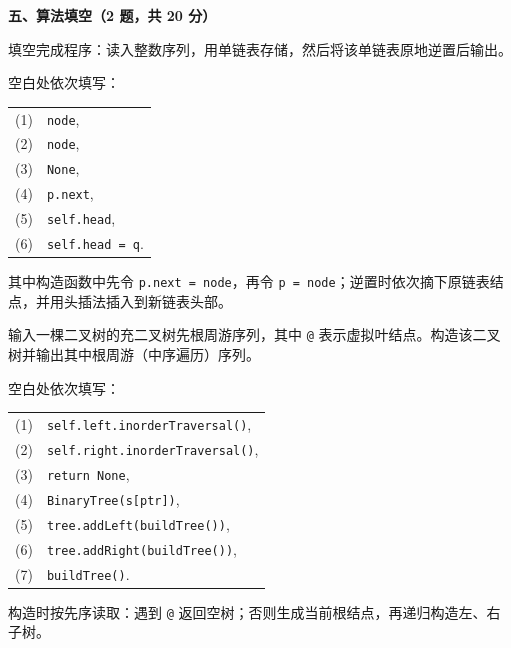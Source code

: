 \textbf{五、算法填空（2 题，共 20 分）}
\begin{question}[单链表逆置]
填空完成程序：读入整数序列，用单链表存储，然后将该单链表原地逆置后输出。
\begin{solution}
空白处依次填写：
\begin{center}
\small
\begin{tabular}{@{}r l@{}}
(1)&\texttt{node},\\
(2)&\texttt{node},\\
(3)&\texttt{None},\\
(4)&\texttt{p.next},\\
(5)&\texttt{self.head},\\
(6)&\texttt{self.head = q}.
\end{tabular}
\end{center}
其中构造函数中先令 \texttt{p.next = node}，再令 \texttt{p = node}；逆置时依次摘下原链表结点，并用头插法插入到新链表头部。
\end{solution}
\end{question}

\begin{question}[由充二叉树先序序列构造二叉树]
输入一棵二叉树的充二叉树先根周游序列，其中 \texttt{@} 表示虚拟叶结点。构造该二叉树并输出其中根周游（中序遍历）序列。
\begin{solution}
空白处依次填写：
\begin{center}
\small
\begin{tabular}{@{}r l@{}}
(1)&\texttt{self.left.inorderTraversal()},\\
(2)&\texttt{self.right.inorderTraversal()},\\
(3)&\texttt{return None},\\
(4)&\texttt{BinaryTree(s[ptr])},\\
(5)&\texttt{tree.addLeft(buildTree())},\\
(6)&\texttt{tree.addRight(buildTree())},\\
(7)&\texttt{buildTree()}.
\end{tabular}
\end{center}
构造时按先序读取：遇到 \texttt{@} 返回空树；否则生成当前根结点，再递归构造左、右子树。
\end{solution}
\end{question}
